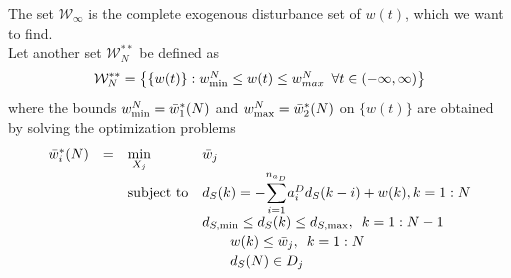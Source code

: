 \documentclass[letterpaper, 10 pt, conference]{ieeeconf}  %
\newcommand{\notimplies}{%
	\mathrel{{\ooalign{\hidewidth$\not\phantom{=}$\hidewidth\cr$\implies$}}}}
\begin{document}
The set $\mathcal{W}_{\infty}$ is the complete exogenous disturbance set of $w(t)$, which we want to find.
	\\
Let another set $\mathcal{W}^{**}_{N}$ be defined as
\begin{equation}
		\hspace{0pt}
		\mathcal{W}^{**}_{N} = \begin{Bmatrix} \{w(t)\}: 
		w^{N}_{\rm min}\leq w(t)\leq w^{N}_{max} \hspace{5pt}
		\forall t \in (-\infty,\infty) 
		\end{Bmatrix}
    \label{eq:W**N}
\end{equation}  
where the bounds $w^{N}_{\rm min}=\bar w_1^*(N)$ and $w^{N}_{\rm max}=\bar w_2^*(N)$ on $\{w(t)\}$ are obtained by solving the optimization problems
	\begin{equation}
	\small
	\label{bound_problem}
	\begin{array}{rcll}
	\bar w_i^*(N)&=&\underset{X_{j}}{\text{min}}& \bar{w}_j \\
	&&\text{subject to} &d_S(k) = -\mathlarger{\sum\limits_{i=1}^{n_{a_D}}}a_i^Dd_S(k-i) + w(k), k={1:N}\\[.2em]
	&&&d_{S,{\rm min}} \leq d_S(k) \leq d_{S,{\rm max}}, \hspace{5pt} k={1:N-1}\\[.2em]
	&&& \hspace{20pt}   w(k) \leq \bar{w}_j, \hspace{5pt} k={1:N}\\[.2em]
    &&& \hspace{20pt}  d_S(N) \in D_j 
	\end{array}
	\end{equation}
\end{document}
